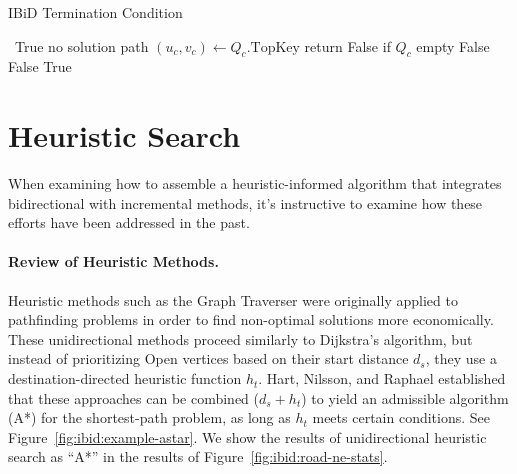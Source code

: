\begin{algorithm}
   \caption{IBiD Termination Condition}
   \label{alg:ibid:ibid-termination}
   \begin{algorithmic}[1]
       {\,}
            \State \Return True
               \Comment no solution path
         \EndIf
         \State $(u_c,v_c) \gets Q_c.\mbox{TopKey}$
            \Comment return False if $Q_c$ empty
            \State \Return False
         \EndIf
            \State \Return False
         \EndIf
         \State \Return True
      \EndFunction
   \end{algorithmic}
\end{algorithm}

\section{Heuristic Search}
\label{sec:ibid:heuristic}

When examining how to assemble a heuristic-informed algorithm
that integrates bidirectional with incremental methods,
it's instructive to examine how these efforts have been addressed
in the past.

\paragraph{Review of Heuristic Methods.}
Heuristic methods such as the Graph Traverser
\citep{doran1966graphtraverser} were originally
applied to pathfinding problems in order to find non-optimal
solutions more economically.
These unidirectional methods proceed similarly to Dijkstra's algorithm,
but instead of prioritizing {\sc Open} vertices
based on their start distance $d_s$,
they use a destination-directed heuristic function $h_t$.
Hart, Nilsson, and Raphael \citep{hart1968astar} established that
these approaches can be combined ($d_s + h_t$) to yield
an admissible algorithm (A*) for the shortest-path problem,
as long as $h_t$ meets certain conditions.
See Figure~\ref{fig:ibid:example-astar}.
We show the results of unidirectional heuristic search as ``A*''
in the results of Figure~\ref{fig:ibid:road-ne-stats}.

